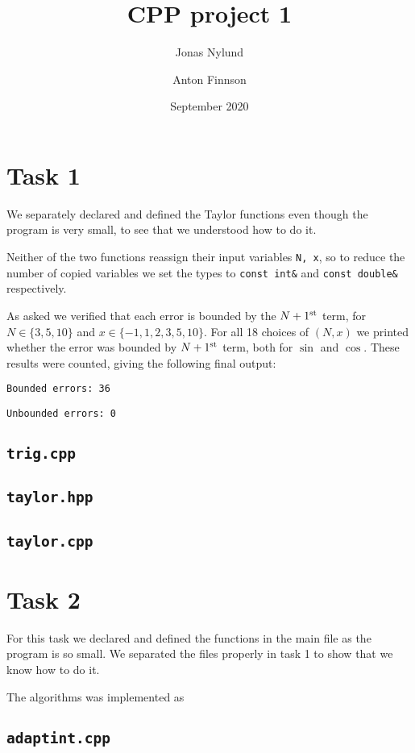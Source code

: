 \documentclass[12pt]{article}
\title{CPP project 1}
\author{Jonas Nylund \and Anton Finnson}
\date{September 2020}
\begin{document}
\maketitle

\section{Task 1}
We separately declared and defined the Taylor functions even though the program is very small, to see that we understood how to do it.

Neither of the two functions reassign their input variables \lstinline{N, x}, so to reduce the number of copied variables we set the types to \lstinline{const int&} and \lstinline{const double&} respectively.

As asked we verified that each error is bounded by the $N+1^{\rm{st}}$ term, for $N \in \{3,5,10\}$ and $x \in \{−1,1,2,3,5,10\}$. For all 18 choices of $(N,x)$ we printed whether the error was bounded by $N+1^{\rm{st}}$ term, both for $\sin$ and $\cos$. These results were counted, giving the following final output:

\lstinline{Bounded errors: 36}

\lstinline{Unbounded errors: 0}


\subsection*{\texttt{trig.cpp}}


\subsection*{\texttt{taylor.hpp}}


\subsection*{\texttt{taylor.cpp}}


\newpage
\section{Task 2}
For this task we declared and defined the functions in the main file as the program is so small. We separated the files properly in task 1 to show that we know how to do it.

The algorithms was implemented as 

\subsection*{\texttt{adaptint.cpp}}

\end{document}
